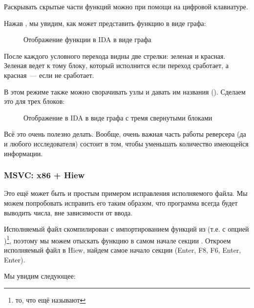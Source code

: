 

Раскрывать скрытые части функций можно при помощи \q{+} на цифровой клавиатуре.

\clearpage
Нажав , мы увидим, как \IDA может представить функцию в виде графа:

\begin{figure}[H]
\centering
{}
\caption{Отображение функции в IDA в виде графа}
\label{fig:ex3_IDA_1}
\end{figure}

После каждого условного перехода видны две стрелки: зеленая и красная.
Зеленая ведет к тому блоку, который исполнится если переход сработает, 
а красная~--- если не сработает.

\clearpage
В этом режиме также можно сворачивать узлы и давать им названия ().
Сделаем это для трех блоков:

\begin{figure}[H]
\centering
{}
\caption{Отображение в IDA в виде графа с тремя свернутыми блоками}
\label{fig:ex3_IDA_2}
\end{figure}

Всё это очень полезно делать.
Вообще, очень важная часть работы реверсера (да и любого исследователя) состоит в том, чтобы уменьшать количество имеющейся информации.



\clearpage
\subsubsection{MSVC: x86 + Hiew}

Это ещё может быть и простым примером исправления исполняемого файла.
Мы можем попробовать исправить его таким образом, что программа всегда будет выводить числа, вне зависимости от ввода.

Исполняемый файл скомпилирован с импортированием функций из
 (т.е. с опцией )\footnote{то, что ещё называют }, 
поэтому мы можем отыскать функцию \main в самом начале секции .
Откроем исполняемый файл в Hiew, найдем самое начало секции  (Enter, F8, F6, Enter, Enter).

Мы увидим следующее:

